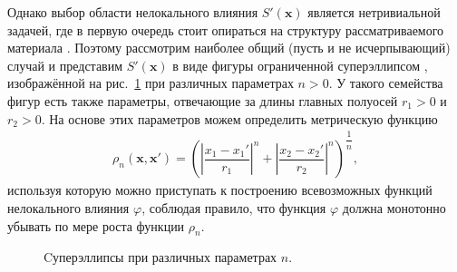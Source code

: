 Однако выбор области нелокального влияния $S'(\boldsymbol{x})$ является нетривиальной задачей, где в первую очередь стоит опираться на структуру рассматриваемого материала \cite{Eringen3}. Поэтому рассмотрим наиболее общий (пусть и не исчерпывающий) случай и представим $S'(\boldsymbol{x})$ в виде фигуры ограниченной суперэллипсом \cite{Superellipse}, изображённой на рис.~\ref{fig:SuperEllipse} при различных параметрах $n > 0$. У такого семейства фигур есть также параметры, отвечающие за длины главных полуосей $r_1 > 0$ и $r_2 > 0$. На основе этих параметров можем определить метрическую функцию
\begin{gather}
	\label{eq:metricFunction}
	\rho_n(\boldsymbol{x}, \boldsymbol{x}') = 
	\left(
		\left| \dfrac{x_1 - x_1'}{r_1} \right|^n +
		\left| \dfrac{x_2 - x_2'}{r_2} \right|^n
	\right)^{\dfrac{1}{n}},
\end{gather}
используя которую можно приступать к построению всевозможных функций нелокального влияния $\varphi$, соблюдая правило, что функция $\varphi$ должна монотонно убывать по мере роста функции $\rho_n$.

\begin{figure}[ht]
    \caption{Cуперэллипсы при различных параметрах $n$.}\label{fig:SuperEllipse}
\end{figure}

